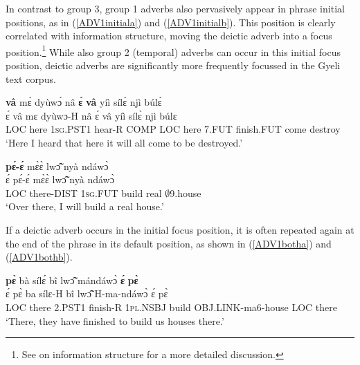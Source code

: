 In contrast to group 3, group 1 adverbs also pervasively appear in phrase initial positions, as in (\ref{ADV1initiala}) and (\ref{ADV1initialb}). This position is clearly correlated with information structure, moving the deictic adverb into a focus position.\footnote{See  on information structure for a more detailed discussion.} While also group 2 (temporal) adverbs can occur in this initial focus position, deictic adverbs are significantly more frequently focussed in the Gyeli text corpus.

\begin{exe} 
\ex\label{ADV1initiala}
   {\bfseries vâ} mɛ̀ dyùwɔ́ nâ {\bfseries ɛ́} {\bfseries vâ} yíì sílɛ̀ njì búlɛ̀  \\   
         ɛ́ vâ mɛ dyùwɔ-H nâ ɛ́ vâ yíì sílɛ̀ njì búlɛ  \\
         LOC here 1\textsc{sg}.PST1 hear-R COMP LOC here 7.FUT finish.FUT come destroy  \\
    \trans `Here I heard that here it will all come to be destroyed.'
\end{exe}

\begin{exe} 
\ex\label{ADV1initialb} 
   {\bfseries pɛ́-ɛ́} mɛ̀ɛ̀ lwɔ̃̂ nyà ndáwɔ̀ \\
        ɛ́ pɛ́-ɛ́ mɛ̀ɛ̀ lwɔ̃̂ nyà ndáwɔ̀  \\
          LOC there-DIST 1\textsc{sg}.FUT build real $\emptyset$9.house \\
    \trans `Over there, I will build a real house.'
\end{exe}



\noindent If a deictic adverb occurs in the initial focus position, it is often repeated again at the end of the phrase in its default position, as shown in (\ref{ADV1botha}) and (\ref{ADV1bothb}).


\begin{exe} 
\ex\label{ADV1botha} 
   {\bfseries pɛ̀} bà sílɛ́ bî lwɔ̃̂ mándáwɔ̀ {\bfseries ɛ́} {\bfseries pɛ̀}  \\
        ɛ́ pɛ̀ ba sílɛ-H bî lwɔ̃̂ H-ma-ndáwɔ̀ ɛ́ pɛ̀  \\
        LOC there 2.PST1 finish-R 1\textsc{pl}.NSBJ build OBJ.LINK-ma6-house LOC there  \\
    \trans `There, they have finished to build us houses there.'
\end{exe}


